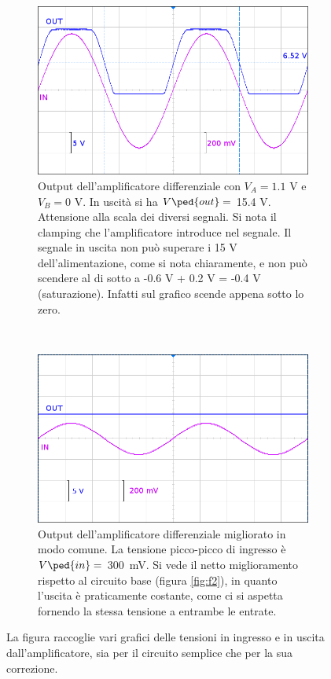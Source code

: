 \begin{figure}[t!]
\begin{subfigure}[t]{0.48\textwidth}
    \end{subfigure}
    \begin{subfigure}[t]{0.48\textwidth}
        \includegraphics[width=\textwidth]{f3.png}
        \caption{Output dell'amplificatore differenziale con $V_A = 1.1$ V e $V_B = 0$ V. In uscità si ha
        $V\ped{out} = $ 15.4 V. Attensione alla scala dei diversi segnali. Si nota il clamping che l'amplificatore introduce nel segnale.
        Il segnale in uscita non può superare i 15 V dell'alimentazione, come si nota chiaramente, e non può scendere al di sotto a -0.6 V + 0.2 V = -0.4 V (saturazione).
        Infatti sul grafico scende appena sotto lo zero.}
        \label{fig:f3}
    \end{subfigure}
    ~
    \begin{subfigure}[t]{0.48\textwidth}
        \includegraphics[width=\textwidth]{f4.png}
        \caption{Output dell'amplificatore differenziale migliorato in modo comune. La tensione picco-picco di ingresso
            è $V\ped{in} =$ \SI{300}{\milli\volt}. Si vede il netto miglioramento rispetto al circuito base (figura \ref{fig:f2}), in quanto l'uscita è praticamente costante,
            come ci si aspetta fornendo la stessa tensione a entrambe le entrate.}
        \label{fig:f4}
    \end{subfigure}

    \caption{La figura raccoglie vari grafici delle tensioni in ingresso e in uscita dall'amplificatore, sia per il circuito semplice che per la sua correzione.}
    \label{fig:graphs}
\end{figure}

